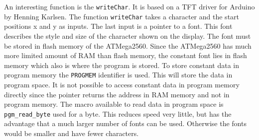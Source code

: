 An interesting function is the \texttt{writeChar}. It is based on a TFT driver for Arduino by Henning Karlsen\cite{UTFTLIB}.
The function \texttt{writeChar} takes a character and the start positions x and y as inputs. 
The last input is a pointer to a font. 
This font describes the style and size of the character shown on the display. 
The font must be stored in flash memory of the ATMega2560. 
Since the ATMega2560 has much more limited amount of RAM than flash memory, the constant font lies in flash memory which also is where the program is stored. \cite[p.~20]{ATmega2560}
To store constant data in program memory the \texttt{PROGMEM} identifier is used. \cite{progmem} 
This will store the data in program space. It is not possible to access constant data in program memory directly since the pointer returns the address in RAM memory and not in program memory. 
The macro available to read data in program space is \texttt{pgm_read_byte} used for a byte. 
This reduces speed very little, but has the advantage that a much larger number of fonts can be used.
Otherwise the fonts would be smaller and have fewer characters. 


